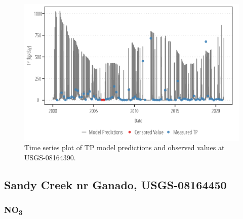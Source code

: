 \documentclass[
]{article}
\begin{document}
\begin{figure}[h]

{\centering \includegraphics{model_assessment_files/figure-pdf/unnamed-chunk-25-1.png}

}

\caption{Time series plot of TP model predictions and observed values at
USGS-08164390.}

\end{figure}

\clearpage

\hypertarget{sandy-creek-nr-ganado-usgs-08164450}{%
\subsection{Sandy Creek nr Ganado,
USGS-08164450}\label{sandy-creek-nr-ganado-usgs-08164450}}

\hypertarget{no3-1}{%
\subsubsection{\texorpdfstring{NO\textsubscript{3}}{NO3}}\label{no3-1}}
\end{document}
